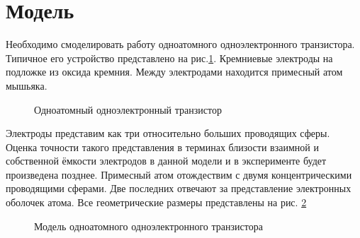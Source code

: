 \documentclass[12pt,a4paper]{report}
\begin{document}
\section{Модель}
Необходимо смоделировать работу  одноатомного одноэлектронного транзистора. Типичное его устройство представлено на рис.\ref{fig:SASET}. Кремниевые электроды на подложке из оксида кремния. Между электродами находится примесный атом мышьяка. 
\begin{figure}[h]
	\caption{Одноатомный одноэлектронный транзистор}
	\label{fig:SASET}
\end{figure}
Электроды представим как три относительно больших проводящих сферы. Оценка точности такого представления в терминах близости взаимной и собственной ёмкости электродов в данной модели и в эксперименте будет произведена позднее. Примесный атом отождествим с двумя концентрическими проводящими сферами. Две последних отвечают за представление электронных оболочек атома. Все геометрические размеры представлены на рис. \ref{fig:SASET model}
\begin{figure}[h]
	\caption{Модель одноатомного одноэлектронного транзистора}
	\label{fig:SASET model}
\end{figure}
\end{document}
